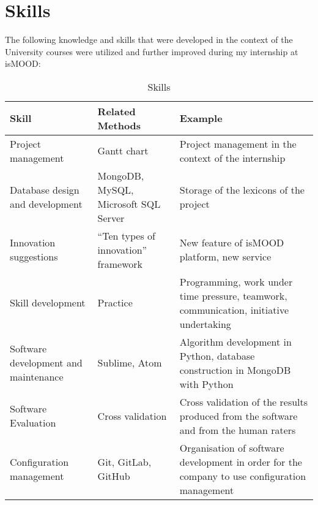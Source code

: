 \section{Skills}
\label{sec:skills}

The following knowledge and skills that were developed
in the context of the University courses were utilized
and further improved during my internship at isMOOD:

\begin{table}[ht]
\caption{\label{tab:skills}Skills}
\begin{tabularx}{\textwidth}{|X|X|X|}
 \hline
 \textbf{Skill} & \textbf{Related Methods} & \textbf{Example} \\ 
 \hline
 Project management & Gantt chart & Project management in the context of the internship \\
 \hline
 Database design and development & MongoDB, MySQL, Microsoft SQL Server & Storage of the lexicons of the project \\ 
 \hline
 Innovation suggestions & ``Ten types of innovation'' framework & New feature of isMOOD platform, new service \\ 
 \hline
 Skill development & Practice & Programming, work under time pressure, teamwork, communication, initiative undertaking \\
 \hline
 Software development and maintenance & Sublime, Atom & Algorithm development in Python, database construction in MongoDB with Python \\
 \hline
 Software Evaluation & Cross validation & Cross validation of the results produced from the software and from the human raters \\
 \hline
 Configuration management & Git, GitLab, GitHub & Organisation of software development in order for the company to use configuration management \\
 \hline
\end{tabularx}
\end{table}
